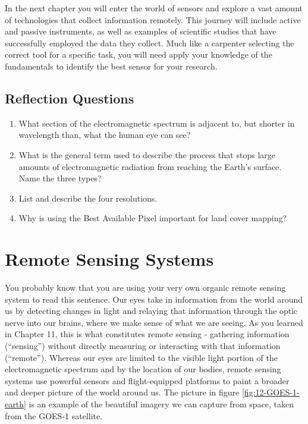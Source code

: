 \documentclass[
]{book}
\providecommand{\tightlist}{%
  \setlength{\itemsep}{0pt}\setlength{\parskip}{0pt}}
\begin{document}
In the next chapter you will enter the world of sensors and explore a
vast amount of technologies that collect information remotely. This
journey will include active and passive instruments, as well as examples
of scientific studies that have successfully employed the data they
collect. Much like a carpenter selecting the correct tool for a specific
task, you will need apply your knowledge of the fundamentals to identify
the best sensor for your research.

\hypertarget{reflection-questions-8}{%
\section{Reflection Questions}\label{reflection-questions-8}}

\begin{enumerate}
\def\labelenumi{\arabic{enumi}.}
\tightlist
\item
  What section of the electromagnetic spectrum is adjacent to, but
  shorter in wavelength than, what the human eye can see?
\item
  What is the general term used to describe the process that stops
  large amounts of electromagnetic radiation from reaching the Earth's
  surface. Name the three types?
\item
  List and describe the four resolutions.
\item
  Why is using the Best Available Pixel important for land cover
  mapping?
\end{enumerate}

\hypertarget{chapter-template}{%
\chapter{Remote Sensing Systems}\label{chapter-template}}

You probably know that you are using your very own organic remote sensing system to read this sentence. Our eyes take in information from the world around us by detecting changes in light and relaying that information through the optic nerve into our brains, where we make sense of what we are seeing. As you learned in Chapter 11, this is what constitutes remote sensing - gathering information (``sensing'') without directly measuring or interacting with that information (``remote''). Whereas our eyes are limited to the visible light portion of the electromagnetic spectrum and by the location of our bodies, remote sensing systems use powerful sensors and flight-equipped platforms to paint a broader and deeper picture of the world around us. The picture in figure \ref{fig:12-GOES-1-earth} is an example of the beautiful imagery we can capture from space, taken from the GOES-1 satellite.
\end{document}
